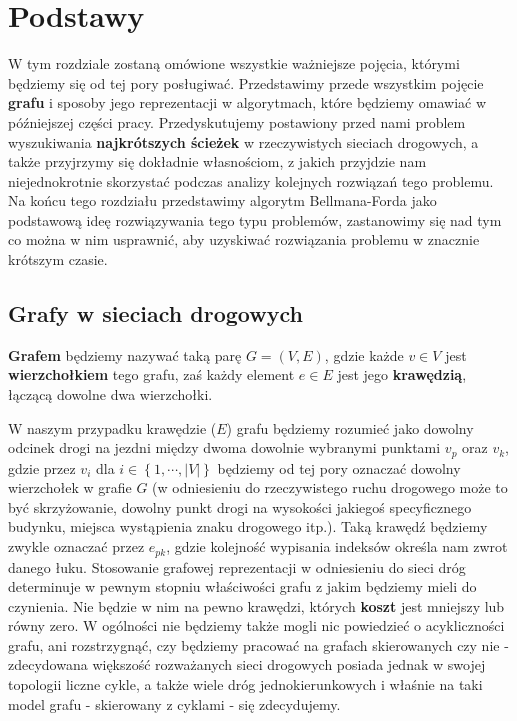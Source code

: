 \chapter{Podstawy}

W tym rozdziale zostaną omówione wszystkie ważniejsze pojęcia, którymi będziemy się od tej pory posługiwać. Przedstawimy przede wszystkim pojęcie \textbf{grafu} i sposoby jego reprezentacji w algorytmach, które będziemy omawiać w późniejszej części pracy. Przedyskutujemy postawiony przed nami problem wyszukiwania \textbf{najkrótszych ścieżek} w rzeczywistych sieciach drogowych, a także przyjrzymy się dokładnie własnościom, z jakich przyjdzie nam niejednokrotnie skorzystać podczas analizy kolejnych rozwiązań tego problemu. Na końcu tego rozdziału przedstawimy algorytm Bellmana-Forda jako podstawową ideę rozwiązywania tego typu problemów, zastanowimy się nad tym co można w nim usprawnić, aby uzyskiwać rozwiązania problemu w znacznie krótszym czasie.

\section{Grafy w sieciach drogowych}

\textbf{Grafem} będziemy nazywać taką parę $G = \left( V, E \right) $, gdzie każde $v \in V$ jest \textbf{wierzchołkiem} tego grafu, zaś każdy element $e \in E$ jest jego \textbf{krawędzią}, łączącą dowolne dwa wierzchołki.

W naszym przypadku krawędzie ($E$) grafu będziemy rozumieć jako dowolny odcinek drogi na jezdni między dwoma dowolnie wybranymi punktami $v_{p}$ oraz $v_{k}$, gdzie przez $v_{i}$ dla $i \in \left\{ 1, \cdots, \left| V \right| \right\}$ będziemy od tej pory oznaczać dowolny wierzchołek w grafie $G$ (w odniesieniu do rzeczywistego ruchu drogowego może to być skrzyżowanie, dowolny punkt drogi na wysokości jakiegoś specyficznego budynku, miejsca wystąpienia znaku drogowego itp.). Taką krawędź będziemy zwykle oznaczać przez $e_{pk}$, gdzie kolejność wypisania indeksów określa nam zwrot danego łuku. Stosowanie grafowej reprezentacji w odniesieniu do sieci dróg determinuje w pewnym stopniu właściwości grafu z jakim będziemy mieli do czynienia. Nie będzie w nim na pewno krawędzi, których \textbf{koszt} jest mniejszy lub równy zero. W ogólności nie będziemy także mogli nic powiedzieć o acykliczności grafu, ani rozstrzygnąć, czy będziemy pracować na grafach skierowanych czy nie - zdecydowana większość rozważanych sieci drogowych posiada jednak w swojej topologii liczne cykle, a także wiele dróg jednokierunkowych i właśnie na taki model grafu - skierowany z cyklami - się zdecydujemy.

